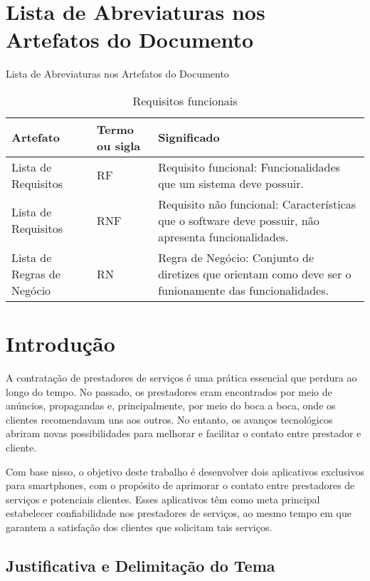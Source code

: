 \chapter{Lista de Abreviaturas nos Artefatos do Documento}
Lista de Abreviaturas nos Artefatos do Documento
\begin{table}[htb]
	\centering
	\caption{\label{Formatação do texto.}Requisitos funcionais}	
	\begin{tabular}{|p{4cm}|m{3cm}|p{7cm}|}
		\hline
		\textbf{Artefato} & \textbf{Termo ou sigla} & \textbf{Significado} \\ \hline
		Lista de Requisitos & RF & Requisito funcional: Funcionalidades que um sistema deve possuir. \\ \hline
		Lista de Requisitos & RNF & Requisito não funcional: Características que o software deve possuir, não apresenta funcionalidades. \\ \hline
		Lista de Regras de Negócio & RN & Regra de Negócio: Conjunto de diretizes que orientam como deve ser o funionamente das funcionalidades. \\ \hline
	\end{tabular}
\end{table}
\chapter{Introdução}
A contratação de prestadores de serviços é uma prática essencial que perdura ao longo do tempo. No passado, os prestadores eram encontrados por meio de anúncios, propagandas e, principalmente, por meio do boca a boca, onde os clientes recomendavam uns aos outros. No entanto, os avanços tecnológicos abriram novas possibilidades para melhorar e facilitar o contato entre prestador e cliente.

Com base nisso, o objetivo deste trabalho é desenvolver dois aplicativos exclusivos para smartphones, com o propósito de aprimorar o contato entre prestadores de serviços e potenciais clientes. Esses aplicativos têm como meta principal estabelecer confiabilidade nos prestadores de serviços, ao mesmo tempo em que garantem a satisfação dos clientes que solicitam tais serviços.


\section{Justificativa e Delimitação do Tema}

